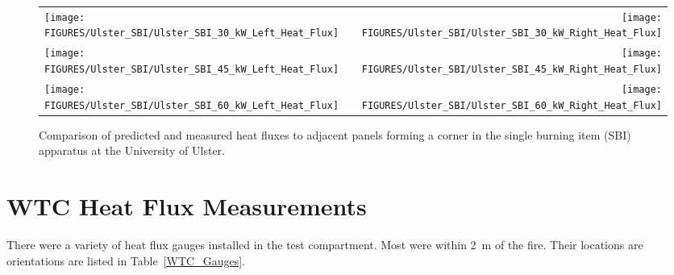 \begin{figure}[p]
\begin{tabular*}{\textwidth}{l@{\extracolsep{\fill}}r}
\texttt{[image: FIGURES/Ulster\_SBI/Ulster\_SBI\_30\_kW\_Left\_Heat\_Flux]} &
\texttt{[image: FIGURES/Ulster\_SBI/Ulster\_SBI\_30\_kW\_Right\_Heat\_Flux]} \\
\texttt{[image: FIGURES/Ulster\_SBI/Ulster\_SBI\_45\_kW\_Left\_Heat\_Flux]} &
\texttt{[image: FIGURES/Ulster\_SBI/Ulster\_SBI\_45\_kW\_Right\_Heat\_Flux]} \\
\texttt{[image: FIGURES/Ulster\_SBI/Ulster\_SBI\_60\_kW\_Left\_Heat\_Flux]} &
\texttt{[image: FIGURES/Ulster\_SBI/Ulster\_SBI\_60\_kW\_Right\_Heat\_Flux]} 
\end{tabular*}
\label{Ulster_SBI}
\caption[Corner heat flux predictions, Ulster SBI experiments.]
{Comparison of predicted and measured heat fluxes to adjacent panels forming a corner in the single
burning item (SBI) apparatus at the University of Ulster.}
\end{figure}

\clearpage

\section{WTC Heat Flux Measurements}

There were a variety of heat flux gauges installed in the test compartment. Most were within 2~m of the fire. Their locations are orientations are listed in Table~\ref{WTC_Gauges}.

